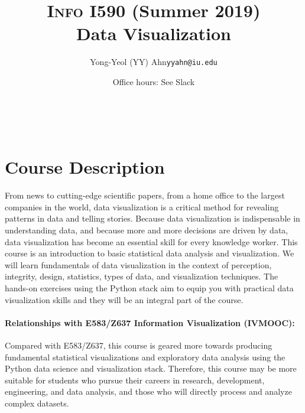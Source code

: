\documentclass[11pt,article,oneside]{memoir} %
\makeatletter
\def\myauthor{Author}
\def\mytitle{Title}
\def\myemail{yyahn@iu.edu}
\def\myauthor{Yong-Yeol (YY) Ahn}
\def\mytitle{{\normalsize \textsc{Info} I590 (Summer 2019)} \\ \HUGE{} Data Visualization}
\makeatother
\begin{document}

\title{\LARGE \mytitle} %
\author{\Large\myauthor\newline \footnotesize\texttt{\noindent\myemail}}

\maketitle 

\vspace{-20pt}{\bfseries Assistant Instructors: TBD} \\ 

\date{Office hours: See Slack}
\section{Course Description}%

From news to cutting-edge scientific papers, from a home office to the largest companies in the world, data visualization is a critical method for revealing patterns in data and telling stories. 
Because data visualization is indispensable in understanding data, and because more and more decisions are driven by data, data visualization has become an essential skill for every knowledge worker.  
This course is an introduction to basic statistical data analysis and visualization.  
We will learn fundamentals of data visualization in the context of perception, integrity, design, statistics, types of data, and visualization techniques.  
The hands-on exercises using the Python stack aim to equip you with practical data visualization skills and they will be an integral part of the course. 

\paragraph{Relationships with E583/Z637 Information Visualization (IVMOOC):}
Compared with E583/Z637, this course is geared more towards producing fundamental statistical visualizations and exploratory data analysis using the Python data science and visualization stack.  
Therefore, this course may be more suitable for students who pursue their careers in research, development, engineering, and data analysis, and those who will directly process and analyze complex datasets. 
\end{document}
